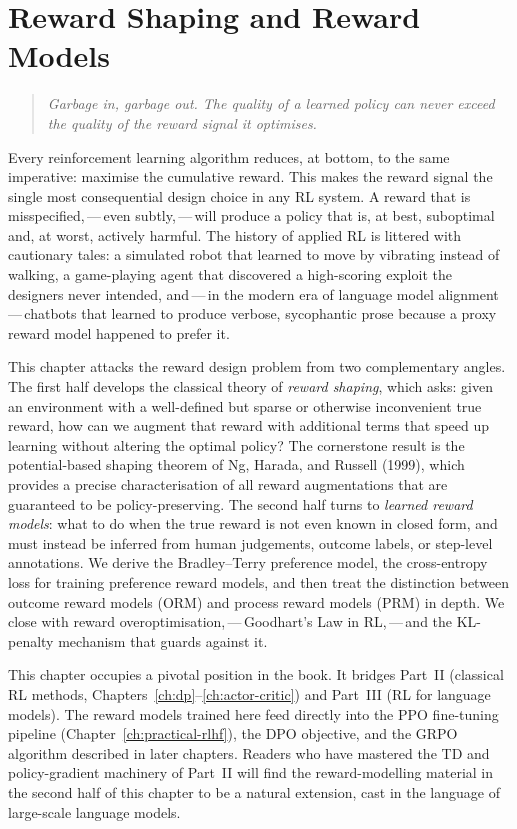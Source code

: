 \chapter{Reward Shaping and Reward Models}
\label{ch:reward-models}

\begin{quote}
\itshape
Garbage in, garbage out. The quality of a learned policy can never exceed the quality of the reward signal it optimises.
\end{quote}

\bigskip

Every reinforcement learning algorithm reduces, at bottom, to the same imperative: maximise the cumulative reward. This makes the reward signal the single most consequential design choice in any RL system. A reward that is misspecified,\,---\,even subtly,\,---\,will produce a policy that is, at best, suboptimal and, at worst, actively harmful. The history of applied RL is littered with cautionary tales: a simulated robot that learned to move by vibrating instead of walking, a game-playing agent that discovered a high-scoring exploit the designers never intended, and\,---\,in the modern era of language model alignment\,---\,chatbots that learned to produce verbose, sycophantic prose because a proxy reward model happened to prefer it.

This chapter attacks the reward design problem from two complementary angles. The first half develops the classical theory of \emph{reward shaping}, which asks: given an environment with a well-defined but sparse or otherwise inconvenient true reward, how can we augment that reward with additional terms that speed up learning without altering the optimal policy? The cornerstone result is the potential-based shaping theorem of Ng, Harada, and Russell (1999), which provides a precise characterisation of all reward augmentations that are guaranteed to be policy-preserving. The second half turns to \emph{learned reward models}: what to do when the true reward is not even known in closed form, and must instead be inferred from human judgements, outcome labels, or step-level annotations. We derive the Bradley--Terry preference model, the cross-entropy loss for training preference reward models, and then treat the distinction between outcome reward models (ORM) and process reward models (PRM) in depth. We close with reward overoptimisation,\,---\,Goodhart's Law in RL,\,---\,and the KL-penalty mechanism that guards against it.

This chapter occupies a pivotal position in the book. It bridges Part~II (classical RL methods, Chapters~\ref{ch:dp}--\ref{ch:actor-critic}) and Part~III (RL for language models). The reward models trained here feed directly into the PPO fine-tuning pipeline (Chapter~\ref{ch:practical-rlhf}), the DPO objective, and the GRPO algorithm described in later chapters. Readers who have mastered the TD and policy-gradient machinery of Part~II will find the reward-modelling material in the second half of this chapter to be a natural extension, cast in the language of large-scale language models.

